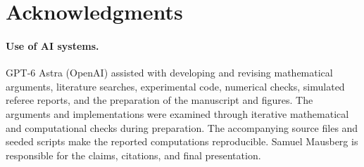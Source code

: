 \section*{Acknowledgments}
\paragraph{Use of AI systems.}
GPT-6 Astra (OpenAI) assisted with developing and revising mathematical arguments, literature searches, experimental code, numerical checks, simulated referee reports, and the preparation of the manuscript and figures. The arguments and implementations were examined through iterative mathematical and computational checks during preparation. The accompanying source files and seeded scripts make the reported computations reproducible. Samuel Mausberg is responsible for the claims, citations, and final presentation.
